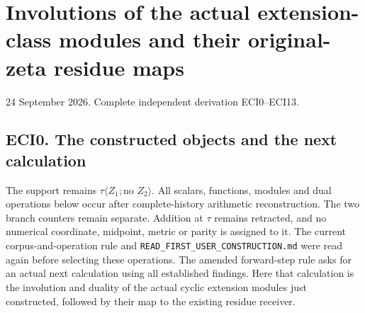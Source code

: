 \section{Involutions of the actual extension-class modules and their
original-zeta residue
maps}\label{involutions-of-the-actual-extension-class-modules-and-their-original-zeta-residue-maps}

24 September 2026. Complete independent derivation ECI0--ECI13.

\subsection{ECI0. The constructed objects and the next
calculation}\label{eci0.-the-constructed-objects-and-the-next-calculation}

The support remains \(\tau\langle Z_1;\text{no }Z_2\rangle\). All
scalars, functions, modules and dual operations below occur after
complete-history arithmetic reconstruction. The two branch counters
remain separate. Addition at \(\tau\) remains retracted, and no
numerical coordinate, midpoint, metric or parity is assigned to it. The
current corpus-and-operation rule and
\texttt{READ\_FIRST\_USER\_CONSTRUCTION.md} were read again before
selecting these operations. The amended forward-step rule asks for an
actual next calculation using all established findings. Here that
calculation is the involution and duality of the actual cyclic extension
modules just constructed, followed by their map to the existing residue
receiver.

